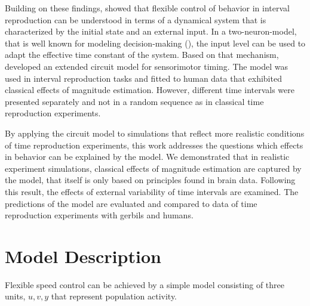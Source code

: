 \documentclass[10pt]{article}
\begin{document}

Building on these findings, \cite{Remington2018} showed that flexible control of behavior in interval reproduction can be understood in terms of a dynamical system that is characterized by the initial state and an external input.
 In a two-neuron-model, that is well known for modeling decision-making (\cite{Roxin2008}), the input level can be used to adapt the effective time constant of the system.
Based on that mechanism, \cite{Egger2020} developed an extended circuit model for sensorimotor timing.
The model was used in interval reproduction tasks and fitted to human data that exhibited classical effects of magnitude estimation. 
However, different time intervals were presented separately and not in a random sequence as in classical time reproduction experiments. 

By applying the circuit model to simulations that reflect more realistic conditions of time reproduction experiments, this work addresses the questions which effects in behavior can be explained by the model. 
We demonstrated that in realistic experiment simulations, classical effects of magnitude estimation are captured by the model, that itself is only based on principles found in brain data.
Following this result, the effects of external variability of time intervals are examined. The predictions of the model are evaluated and compared to data of time reproduction experiments with gerbils and humans.

\section{Model Description}
Flexible speed control can be achieved by a simple model consisting of three units, $u, v, y$ that represent population activity. 
\end{document}
